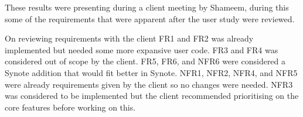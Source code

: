 These results were presenting during a client meeting by Shameem, during this some of the requirements that were apparent after the user study were reviewed.

On reviewing requirements with the client FR1 and FR2 was already implemented but needed some more expansive user code. FR3 and FR4 was considered out of scope by the client. FR5, FR6, and NFR6 were considered a Synote addition that would fit better in Synote. NFR1, NFR2, NFR4, and NFR5 were already requirements given by the client so no changes were needed. NFR3 was considered to be implemented but the client recommended prioritising on the core features before working on this. 
